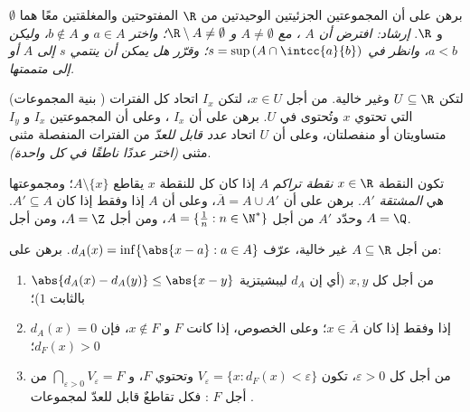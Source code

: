 \begin{exercise}[$\star\star\star$]\label{exo:b1:topology:9}
برهن على أن المجموعتين الجزئيتين الوحيدتين من $\R$ المفتوحتين والمغلقتين معًا هما
$\emptyset$ و $\R$. \emph{إرشاد: افترض أن $A$  ، مع
$A \neq \emptyset$ و $\R \setminus A \neq \emptyset$؛ واختر $a \in
A$ و $b \notin A$، وليكن $a < b$، وانظر في $s = \sup\,(A \cap
\intcc{a}{b})$؛ وقرّر هل يمكن أن ينتمي $s$ إلى $A$ أو إلى
متممتها.}
\end{exercise}

\begin{exercise}[$\star\star\star$]\label{exo:b1:topology:10}
(بنية المجموعات ) لتكن $U \subseteq \R$  وغير خالية. من أجل
$x \in U$، لتكن $I_x$ اتحاد كل الفترات  التي تحتوي
$x$ وتُحتوى في $U$. برهن على أن $I_x$  ، وعلى أن
المجموعتين $I_x$ و $I_y$ متساويتان أو منفصلتان، وعلى أن $U$ اتحاد
\emph{عدد قابل للعدّ} من الفترات  المنفصلة مثنى مثنى \emph{(اختر
عددًا ناطقًا في كل واحدة)}.
\end{exercise}

\begin{exercise}[$\star\star$]\label{exo:b1:topology:11}
تكون النقطة $x \in \R$ \emph{نقطة تراكم}  $A$ إذا كان
كل  للنقطة $x$ يقاطع $A \setminus \{x\}$؛ ومجموعتها هي
\emph{ المشتقة} $A'$. برهن على أن $\overline A = A \cup A'$،
وعلى أن $A$  إذا وفقط إذا كان $A' \subseteq A$. وحدّد
$A'$ من أجل $A = \{\frac 1n : n \in \N^*\}$، ومن أجل $A = \Z$، ومن أجل
$A = \Q$.
\end{exercise}

\begin{exercise}[$\star\star\star$]\label{exo:b1:topology:12}
من أجل $A \subseteq \R$ غير خالية، عرّف $d_A(x) = \inf\{\abs{x - a}
: a \in A\}$. برهن على:
\begin{enumerate}
  \item $\abs{d_A(x) - d_A(y)} \leq \abs{x - y}$ من أجل كل $x, y$
        (أي إن $d_A$ ليبشيتزية بالثابت $1$)؛
  \item $d_A(x) = 0$ إذا وفقط إذا كان $x \in \overline A$؛ وعلى
        الخصوص، إذا كانت $F$  و $x \notin F$، فإن
        $d_F(x) > 0$؛
  \item من أجل كل $\varepsilon > 0$، تكون  $V_\varepsilon =
        \{x : d_F(x) < \varepsilon\}$  وتحتوي $F$، و
        $\bigcap_{\varepsilon > 0} V_\varepsilon = F$ من أجل $F$
        : فكل  تقاطعٌ قابل للعدّ لمجموعات
        .
\end{enumerate}
\end{exercise}

